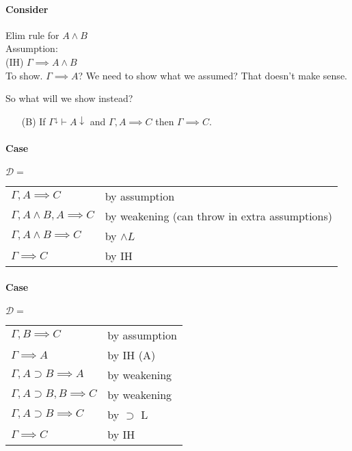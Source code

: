 \documentclass[12 pt]{article}
\begin{document}
	\paragraph{Consider} Elim rule for $A \land B$
	\\ Assumption: \DP
	\\ (IH) $\Gamma \implies A \land B$
	\\ To show. $\Gamma \implies A$? We need to show what we
	assumed? That doesn't make sense.

	So what will we show instead?
	\begin{enumerate}[(A)]
		\item[(B)] If $\Gamma^{\downarrow} \vdash A \downarrow$ and
		      $\Gamma, A \implies C$ then $\Gamma \implies C$.
	\end{enumerate}
	\paragraph{Case} $\mathcal{D}=$ \DP
	\\
	\begin{tabular}{l l}
		$\Gamma, A \implies C$ & by assumption
		\\ $\Gamma, A \land B, A \implies C$& by weakening (can throw in extra assumptions)
		\\ $\Gamma, A \land B \implies C$ & by $\land L$
		\\ $\Gamma \implies C$ & by IH
	\end{tabular}
	\paragraph{Case} $\mathcal{D} =$ \DP
	\\
	\begin{tabular}{l l}
		$\Gamma, B \implies C$ & by assumption
		\\ $\Gamma \implies A$ & by IH (A)
		\\ $\Gamma, A \supset B \implies A$ & by weakening
		\\ $\Gamma, A \supset B, B \implies C$& by weakening
		\\ $\Gamma, A \supset B \implies C$ & by $\supset$ L
		\\ $\Gamma \implies C$ & by IH
	\end{tabular}
\end{document}
